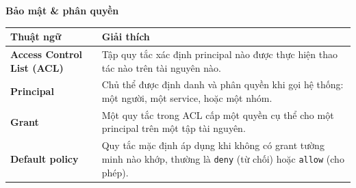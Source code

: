 \textbf{Bảo mật \& phân quyền}

\begin{table}[H]
\centering
\begin{tabular}{p{3cm}p{12cm}}
\toprule
Thuật ngữ & Giải thích \\
\midrule
\textbf{Access Control List (ACL)} & Tập quy tắc xác định principal nào được thực hiện thao tác nào trên tài nguyên nào. \\
\textbf{Principal} & Chủ thể được định danh và phân quyền khi gọi hệ thống: một người, một service, hoặc một nhóm. \\
\textbf{Grant} & Một quy tắc trong ACL cấp một quyền cụ thể cho một principal trên một tập tài nguyên. \\
\textbf{Default policy} & Quy tắc mặc định áp dụng khi không có grant tường minh nào khớp, thường là \texttt{deny} (từ chối) hoặc \texttt{allow} (cho phép). \\
\bottomrule
\end{tabular}
\end{table}